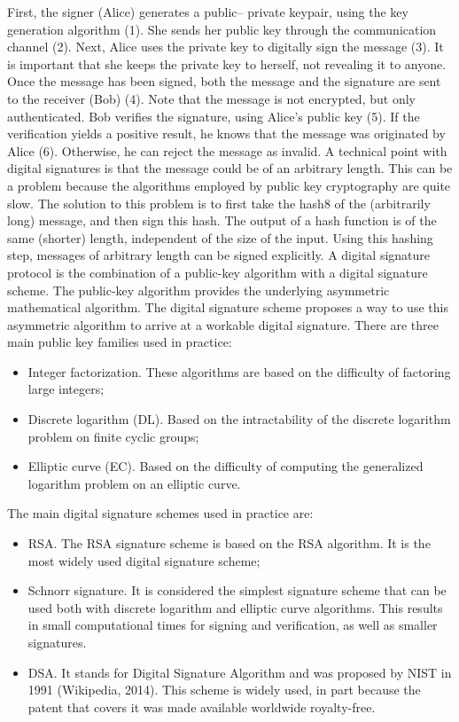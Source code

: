 \documentclass{article}
\begin{document}
\noindent First, the signer (Alice) generates a public– private keypair, using the key generation algorithm (1). She sends her public key through the communication channel (2). Next, Alice uses the private key to digitally sign the message (3). It is important that she keeps the private key to herself, not revealing it to anyone. Once the message has been signed, both the message and the signature are sent to the receiver (Bob) (4). Note that the message is not encrypted, but only authenticated. Bob verifies the signature, using Alice’s public key (5). If the verification yields a positive result, he knows that the message was originated by Alice (6). Otherwise, he can reject the message as invalid.\newline
A technical point with digital signatures is that the message could be of an arbitrary length. This can be a problem because the algorithms employed by public key cryptography are quite slow. The solution to this problem is to first take the hash8 of the (arbitrarily long) message, and then sign this hash. The output of a hash function is of the same (shorter) length, independent of the size of the input. Using this hashing step, messages of arbitrary length can be signed explicitly.\newline
A digital signature protocol is the combination of a public-key algorithm with a digital signature scheme. The public-key algorithm provides the underlying asymmetric mathematical algorithm. The digital signature scheme proposes a way to use this asymmetric algorithm to arrive at a workable digital signature. There are three main public key families used in practice:
\begin{itemize}
    \item Integer factorization. These algorithms are based on the difficulty of factoring large integers;
    \item Discrete logarithm (DL). Based on the intractability of the discrete logarithm problem on finite cyclic groups;
    \item Elliptic curve (EC). Based on the difficulty of computing the generalized logarithm problem on an elliptic curve.
\end{itemize}
The main digital signature schemes used in practice are:
\begin{itemize}
    \item RSA. The RSA signature scheme is based on the RSA algorithm. It is the most widely used digital signature scheme;
    \item Schnorr signature. It is considered the simplest signature scheme that can be used both with discrete logarithm and elliptic curve algorithms. This results in small computational times for signing and verification, as well as smaller signatures.
    \item DSA. It stands for Digital Signature Algorithm and was proposed by NIST in 1991 (Wikipedia, 2014). This scheme is widely used, in part because the patent that covers it was made available worldwide royalty-free.
\end{itemize}
\end{document}

